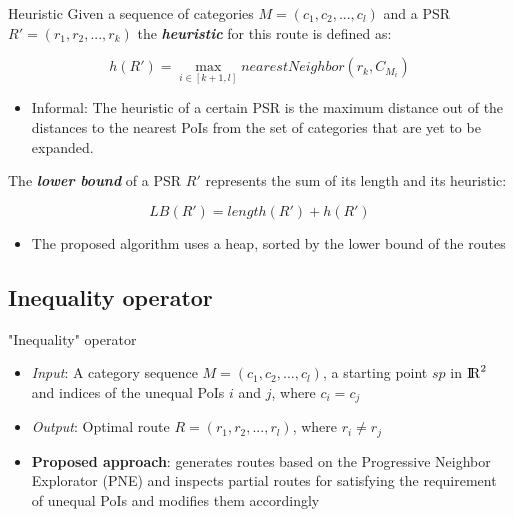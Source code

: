 \documentclass[18pt]{beamer}
\begin{document}
		\begin{frame}{Heuristic}
			Given a sequence of categories $M = (c_1, c_2, ..., c_l)$ and a PSR $R' = (r_1, r_2, ..., r_k)$ the \textbf{\textit{heuristic}} for this route is defined as: 
			
			\begin{equation}
			h(R') = \max_{i \in [k+1, l]} nearestNeighbor(r_k, C_{M_{i}})
			\end{equation}
			
			\begin{itemize}
				\item Informal: The heuristic of a certain PSR is the maximum distance out of the distances to the nearest PoIs from the set of categories that are yet to be expanded. 
			\end{itemize}
			\pause
			The \textbf{\textit{lower bound}} of a PSR $R'$ represents the sum of its length and its heuristic:
			
			\begin{equation}
			LB(R') = length(R') + h(R')
			\end{equation}
			
			\begin{itemize}
				\item The proposed algorithm uses a heap, sorted by the lower bound of the routes
			\end{itemize}
		\end{frame}
	
		
					
	\subsection{Inequality operator}
		\begin{frame}{"Inequality" operator}
		
			\begin{itemize}
				\item \textit{Input}: A category sequence $M = (c_1, c_2, ..., c_l)$, a starting point $sp$ in ${\rm I\!R}^2$ and indices of the unequal PoIs $i$ and $j$, where $c_i = c_j$
				\item \textit{Output}: Optimal route $R = (r_1, r_2, ..., r_l)$, where $r_i \neq r_j$ \newline
				\item \textbf{Proposed approach}: generates routes based on the Progressive Neighbor Explorator (PNE) and inspects partial routes for satisfying the requirement of unequal PoIs and modifies them accordingly
			\end{itemize}
		
		\end{frame}
	
\end{document}
